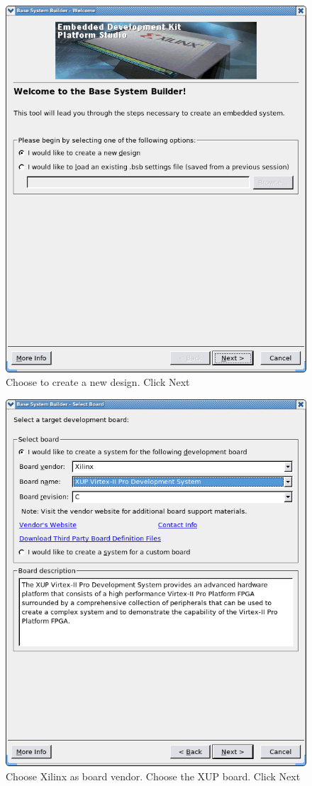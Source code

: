 \documentclass[a4paper,oneside]{memoir}
\begin{document}
\begin{figure}[H]
\centering
\includegraphics[scale=0.4]{BSB1}
\caption{Choose to create a new design. Click Next\label{fig:BSB1}}
\end{figure}
\begin{figure}[H]
\centering
\includegraphics[scale=0.4]{BSB2}
\caption{Choose Xilinx as board vendor. Choose the XUP board. Click Next\label{fig:BSB2}}
\end{figure}
\end{document}
